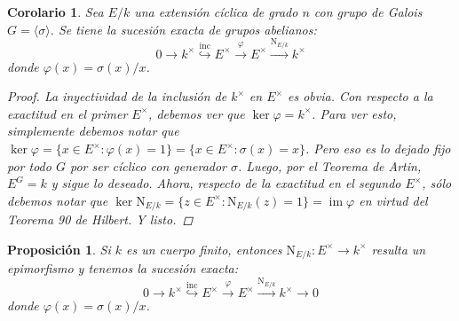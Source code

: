 \documentclass[12pt]{book}
\newtheorem{prop}[teo]{Proposición}
\newtheorem{cor}[teo]{Corolario}
\theoremstyle{definition}
\DeclareMathOperator{\im}{im}
\begin{document}
\begin{cor}
Sea $E/k$ una extensión cíclica de grado $n$ con grupo de Galois $G=\langle \sigma\rangle$. Se tiene la sucesión exacta de grupos abelianos: $$ 0\longrightarrow k^\times \stackrel{\mathrm{inc}}{\hookrightarrow} E^\times\stackrel{\varphi}{\longrightarrow} E^\times \stackrel{\mathrm{N}_{E/k}}{\longrightarrow}k^\times$$ donde $\varphi(x)=\sigma(x)/x$.
\begin{proof}
La inyectividad de la inclusión de $k^\times$ en $E^\times$ es obvia. Con respecto a la exactitud en el primer $E^\times$, debemos ver que $\ker\varphi = k^\times$. Para ver esto, simplemente debemos notar que $\ker\varphi = \{x\in E^\times : \varphi(x)=1\} = \{x\in E^\times : \sigma(x)=x\}$. Pero eso es lo dejado fijo por todo $G$ por ser cíclico con generador $\sigma$. Luego, por el Teorema de Artin, $E^G=k$ y sigue lo deseado. Ahora, respecto de la exactitud en el segundo $E^\times$, sólo debemos notar que $\ker\mathrm{N}_{E/k} = \{z\in E^\times : \mathrm{N}_{E/k}(z)=1\} = \im \varphi$ en virtud del Teorema 90 de Hilbert. Y listo.
\end{proof}
\end{cor}

\begin{prop}
Si $k$ es un cuerpo finito, entonces $\mathrm{N}_{E/k}:E^\times\to k^\times$ resulta un epimorfismo y tenemos la sucesión exacta:$$ 0\longrightarrow k^\times \stackrel{\mathrm{inc}}{\hookrightarrow} E^\times\stackrel{\varphi}{\longrightarrow} E^\times \stackrel{\mathrm{N}_{E/k}}{\longrightarrow}k^\times\longrightarrow 0$$ donde $\varphi(x)=\sigma(x)/x$.
\end{prop}
\end{document}
